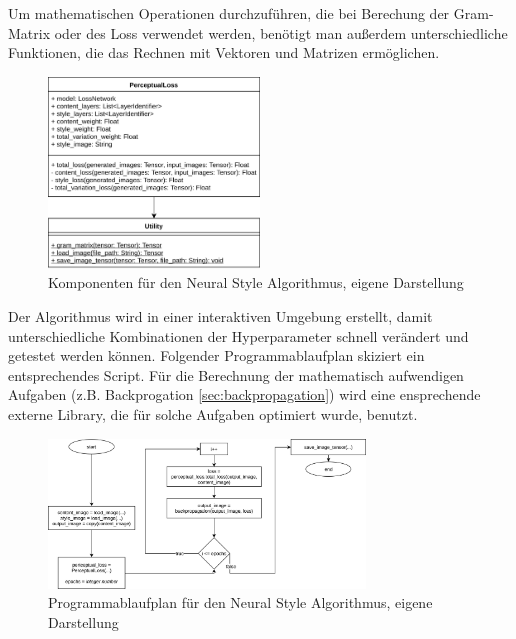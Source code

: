 Um mathematischen Operationen durchzuführen, die bei Berechung der Gram-Matrix oder des Loss verwendet werden, benötigt man außerdem unterschiedliche Funktionen, die das Rechnen mit Vektoren und Matrizen ermöglichen.


\begin{figure}[H]
	\centering
	\includegraphics[width=0.50\textwidth]{resources/content/neural_style_class_diagram.png}
	\caption{Komponenten für den Neural Style Algorithmus, eigene Darstellung}
	\label{img:neural_style_class_diagram_img}
\end{figure}

Der Algorithmus wird in einer interaktiven Umgebung erstellt, damit unterschiedliche Kombinationen der Hyperparameter schnell verändert und getestet werden können. Folgender Programmablaufplan skiziert ein entsprechendes Script. Für die Berechnung der mathematisch aufwendigen Aufgaben (z.B. Backprogation \ref{sec:backpropagation}) wird eine ensprechende externe Library, die für solche Aufgaben optimiert wurde, benutzt.

\begin{figure}[H]
	\centering
	\includegraphics[width=0.75\textwidth]{resources/content/neural_style_pap.png}
	\caption{Programmablaufplan für den Neural Style Algorithmus, eigene Darstellung}
	\label{img:neural_style_pap_img}
\end{figure}

